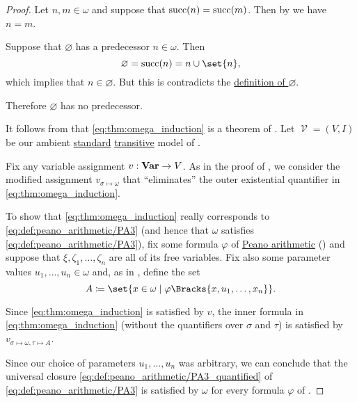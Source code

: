 \begin{proof}
   Let \( n, m \in \omega \) and suppose that \( \operatorname{succ}(n) = \operatorname{succ}(m) \). Then by  we have \( n = m \).

   Suppose that \( \varnothing \) has a predecessor \( n \in \omega \). Then
  \begin{equation*}
    \varnothing = \op{succ}(n) = n \cup \set{ n },
  \end{equation*}
  which implies that \( n \in \varnothing \). But this is contradicts the \hyperref[def:empty_set]{definition of \( \varnothing \)}.

  Therefore \( \varnothing \) has no predecessor.

   It follows from  that \eqref{eq:thm:omega_induction} is a theorem of . Let \( \mscrV = (V, I) \) be our ambient \hyperref[rem:standard_model_of_set_theory]{standard} \hyperref[rem:transitive_model_of_set_theory]{transitive} model of .

  Fix any variable assignment \( v: \operatorname{\mathbf{Var}} \to V \). As in the proof of , we consider the modified assignment \( v_{\sigma \mapsto \omega} \) that \enquote{eliminates} the outer existential quantifier in \eqref{eq:thm:omega_induction}.

  To show that \eqref{eq:thm:omega_induction} really corresponds to \eqref{eq:def:peano_arithmetic/PA3} (and hence that \( \omega \) satisfies \eqref{eq:def:peano_arithmetic/PA3}), fix some formula \( \varphi \) of \hyperref[def:peano_arithmetic]{Peano arithmetic} () and suppose that \( \xi, \zeta_1, \ldots, \zeta_n \) are all of its free variables. Fix also some parameter values \( u_1, \ldots, u_n \in \omega \) and, as in , define the set
  \begin{equation*}
    A \coloneqq \set{ x \in \omega \given \varphi\Bracks{x, u_1, \ldots, x_n} }.
  \end{equation*}

  Since \eqref{eq:thm:omega_induction} is satisfied by \( v \), the inner formula in \eqref{eq:thm:omega_induction} (without the quantifiers over \( \sigma \) and \( \tau \)) is satisfied by \( v_{\sigma \mapsto \omega, \tau \mapsto A} \).

  Since our choice of parameters \( u_1, \ldots, u_n \) was arbitrary, we can conclude that the universal closure \eqref{eq:def:peano_arithmetic/PA3_quantified} of \eqref{eq:def:peano_arithmetic/PA3} is satisfied by \( \omega \) for every formula \( \varphi \) of .


\end{proof}
